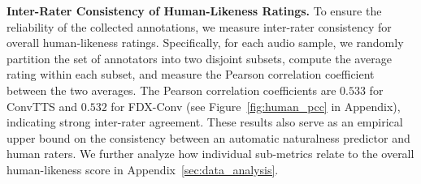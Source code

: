 \textbf{Inter-Rater Consistency of Human-Likeness Ratings.}
To ensure the reliability of the collected annotations, we measure inter-rater consistency for overall human-likeness ratings. Specifically, for each audio sample, we randomly partition the set of annotators into two disjoint subsets, compute the average rating within each subset, and measure the Pearson correlation coefficient between the two averages. The Pearson correlation coefficients are $0.533$ for ConvTTS and $0.532$ for FDX-Conv (see Figure~\ref{fig:human_pcc} in Appendix), indicating strong inter-rater agreement. These results also serve as an empirical upper bound on the consistency between an automatic naturalness predictor and human raters. We further analyze how individual sub-metrics relate to the overall human-likeness score in Appendix~\ref{sec:data_analysis}.